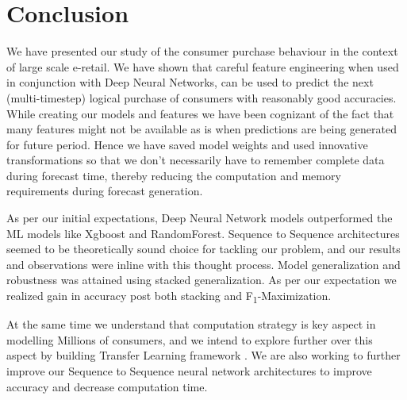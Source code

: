 \section{Conclusion}
\label{sec:conclusion}
We have presented our study of the consumer purchase behaviour in the context of large scale e-retail. 
We have shown that careful feature
engineering when used in conjunction with Deep Neural Networks, can be used
to predict the next (multi-timestep) logical purchase of consumers with reasonably good accuracies.
While creating our models and features we have been cognizant of
the fact that many features might not be available as is when predictions
are being generated for future period. Hence we have saved model weights and used innovative transformations 
so that we don’t necessarily have to remember complete data during forecast time,
thereby reducing the computation and memory requirements during forecast generation.

As per our initial expectations, Deep Neural Network models outperformed the ML models like Xgboost and RandomForest.
Sequence to Sequence architectures seemed to be theoretically sound choice for tackling our problem, and our results and 
observations were inline with this thought process. Model generalization and robustness
was attained using stacked generalization. As per our expectation we realized gain in accuracy post both stacking
and F\textsubscript{1}-Maximization.

At the same time we understand that computation strategy is key aspect in modelling
Millions of consumers, and we intend to explore further over this aspect by building 
Transfer Learning framework \cite{yosinski2014transferable}. We are also working to 
further improve our Sequence to Sequence neural network architectures to improve accuracy
and decrease computation time.
 

